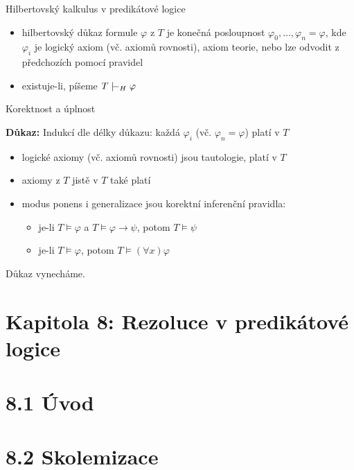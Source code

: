 \documentclass{beamer}
\begin{document}
\begin{frame}{Hilbertovský kalkulus v predikátové logice}
\begin{itemize}
        \item \alert{hilbertovský důkaz} formule $\varphi$ z $T$ je \alert{konečná} posloupnost $\varphi_0, \dots, \varphi_n=\varphi$, kde $\varphi_i$ je \alert{logický axiom} (vč. axiomů rovnosti), \alert{axiom teorie}, nebo lze odvodit z předchozích pomocí pravidel
        \item existuje-li, píšeme \alert{$T\proves_H\varphi$}
    \end{itemize}

\end{frame}


\begin{frame}{Korektnost a úplnost}


    \medskip

    \textbf{Důkaz:} Indukcí dle délky důkazu: každá $\varphi_i$ (vč. $\varphi_n=\varphi$) platí v $T$
    \begin{itemize}
        \item logické axiomy (vč. axiomů rovnosti) jsou tautologie, platí v $T$
        \item axiomy z $T$ jistě v $T$ také platí
         \item modus ponens i generalizace jsou \alert{korektní} inferenční pravidla:
        \begin{itemize}
            \item je-li $T\models\varphi$ a $T\models\varphi\to\psi$, potom $T\models\psi$
            \item je-li $T\models\varphi$, potom $T\models(\forall x)\varphi$
            \hfill\qedsymbol
        \end{itemize}
    \end{itemize}

    \bigskip
    

    Důkaz vynecháme.
    
\end{frame}


\section{\sc Kapitola 8: Rezoluce v predikátové logice}


\section{8.1 Úvod}


\section{8.2 Skolemizace}
\end{document}
